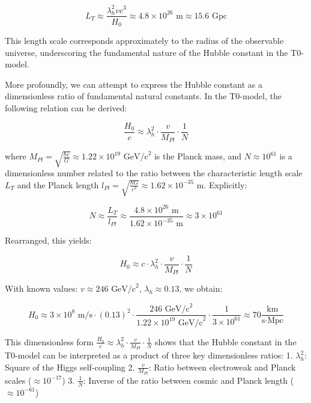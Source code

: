 \documentclass[a4paper,12pt]{article}
\theoremstyle{definition}
\theoremstyle{remark}
\begin{document}
	\begin{equation}
		L_T \approx \frac{\lambda_h^2 v c^3}{H_0} \approx 4.8 \times 10^{26} \text{ m} \approx 15.6 \text{ Gpc}
	\end{equation}
	
	This length scale corresponds approximately to the radius of the observable universe, underscoring the fundamental nature of the Hubble constant in the T0-model.
	
	More profoundly, we can attempt to express the Hubble constant as a dimensionless ratio of fundamental natural constants. In the T0-model, the following relation can be derived:
	
	\begin{equation}
		\frac{H_0}{c} \approx \lambda_h^2 \cdot \frac{v}{M_{Pl}} \cdot \frac{1}{N}
	\end{equation}
	
	where \(M_{Pl} = \sqrt{\frac{\hbar c}{G}} \approx 1.22 \times 10^{19} \text{ GeV/c}^2\) is the Planck mass, and \(N \approx 10^{61}\) is a dimensionless number related to the ratio between the characteristic length scale \(L_T\) and the Planck length \(l_{Pl} = \sqrt{\frac{\hbar G}{c^3}} \approx 1.62 \times 10^{-35} \text{ m}\). Explicitly:
	
	\begin{equation}
		N \approx \frac{L_T}{l_{Pl}} \approx \frac{4.8 \times 10^{26} \text{ m}}{1.62 \times 10^{-35} \text{ m}} \approx 3 \times 10^{61}
	\end{equation}
	
	Rearranged, this yields:
	
	\begin{equation}
		H_0 \approx c \cdot \lambda_h^2 \cdot \frac{v}{M_{Pl}} \cdot \frac{1}{N}
	\end{equation}
	
	With known values: \(v \approx 246 \text{ GeV/c}^2\), \(\lambda_h \approx 0.13\), we obtain:
	
	\begin{equation}
		H_0 \approx 3 \times 10^8 \text{ m/s} \cdot (0.13)^2 \cdot \frac{246 \text{ GeV/c}^2}{1.22 \times 10^{19} \text{ GeV/c}^2} \cdot \frac{1}{3 \times 10^{61}} \approx 70 \frac{\text{km}}{\text{s} \cdot \text{Mpc}}
	\end{equation}
	
	This dimensionless form \(\frac{H_0}{c} \approx \lambda_h^2 \cdot \frac{v}{M_{Pl}} \cdot \frac{1}{N}\) shows that the Hubble constant in the T0-model can be interpreted as a product of three key dimensionless ratios:
	1. \(\lambda_h^2\): Square of the Higgs self-coupling
	2. \(\frac{v}{M_{Pl}}\): Ratio between electroweak and Planck scales (\(\approx 10^{-17}\))
	3. \(\frac{1}{N}\): Inverse of the ratio between cosmic and Planck length (\(\approx 10^{-61}\))
	
\end{document}

